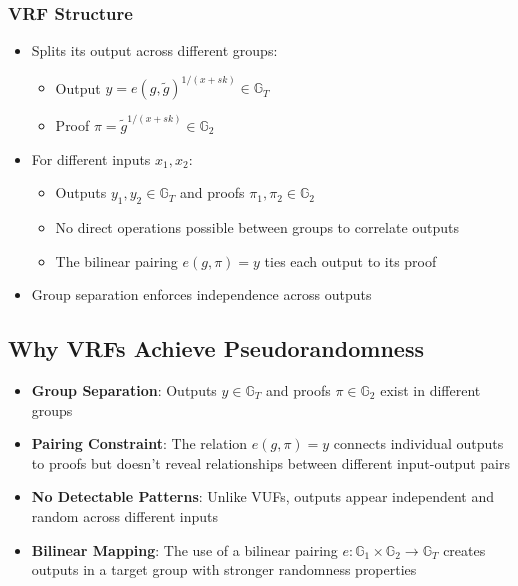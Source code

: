 \subsubsection{VRF Structure}
\begin{itemize}
    \item Splits its output across different groups:
    \begin{itemize}
        \item Output $y = e(g, \tilde{g})^{1/(x + sk)} \in \mathbb{G}_T$
        \item Proof $\pi = \tilde{g}^{1/(x + sk)} \in \mathbb{G}_2$
    \end{itemize}
    \item For different inputs $x_1, x_2$:
    \begin{itemize}
        \item Outputs $y_1, y_2 \in \mathbb{G}_T$ and proofs $\pi_1, \pi_2 \in \mathbb{G}_2$
        \item No direct operations possible between groups to correlate outputs
        \item The bilinear pairing $e(g, \pi) = y$ ties each output to its proof
    \end{itemize}
    \item Group separation enforces independence across outputs
\end{itemize}

\subsection{Why VRFs Achieve Pseudorandomness}
\begin{itemize}
    \item \textbf{Group Separation}: Outputs $y \in \mathbb{G}_T$ and proofs $\pi \in \mathbb{G}_2$ exist in different groups
    \item \textbf{Pairing Constraint}: The relation $e(g, \pi) = y$ connects individual outputs to proofs but doesn't reveal relationships between different input-output pairs
    \item \textbf{No Detectable Patterns}: Unlike VUFs, outputs appear independent and random across different inputs
    \item \textbf{Bilinear Mapping}: The use of a bilinear pairing $e: \mathbb{G}_1 \times \mathbb{G}_2 \rightarrow \mathbb{G}_T$ creates outputs in a target group with stronger randomness properties
\end{itemize}

